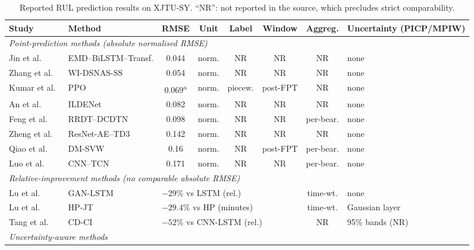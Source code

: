 \begin{table}[!htbp]
\centering
\caption{Reported RUL prediction results on XJTU-SY. ``NR'': not
reported in the source, which precludes strict comparability.}
\label{tab:benchmark}
\scriptsize
\renewcommand{\arraystretch}{1.15}
\setlength{\tabcolsep}{3pt}
\begin{tabular}{llcccccl}
\toprule
\textbf{Study} & \textbf{Method} & \textbf{RMSE} & \textbf{Unit} &
\textbf{Label} & \textbf{Window} & \textbf{Aggreg.} &
\textbf{Uncertainty (PICP/MPIW)} \\
\midrule
\multicolumn{8}{l}{\textit{Point-prediction methods (absolute normalised RMSE)}}\\
Jin et al.~\cite{app15179529}        & EMD--BiLSTM--Transf. & 0.044 & norm. & NR & NR & NR & none \\
Zhang et al.~\cite{11682466}         & WI-DSNAS-SS          & 0.054 & norm. & NR & NR & NR & none \\
Kumar et al.~\cite{machines14060672} & PPO                  & 0.069\textsuperscript{a} & norm. & piecew. & post-FPT & NR & none \\
An et al.~\cite{10935355}            & ILDENet              & 0.082 & norm. & NR & NR & NR & none \\
Feng et al.~\cite{FENG2026105865}    & RRDT--DCDTN          & 0.098 & norm. & NR & NR & per-bear. & none \\
Zheng et al.~\cite{10423873}         & ResNet-AE--TD3       & 0.142 & norm. & NR & NR & NR & none \\
Qiao et al.~\cite{QIAO2026112248}    & DM-SVW               & 0.16  & norm. & NR & post-FPT & per-bear. & none \\
Luo et al.~\cite{11637655}           & CNN--TCN             & 0.171 & norm. & NR & NR & per-bear. & none \\
\midrule
\multicolumn{8}{l}{\textit{Relative-improvement methods (no comparable absolute RMSE)}}\\
Lu et al.~\cite{9486650}             & GAN-LSTM             & \multicolumn{4}{l}{$-29\%$ vs LSTM (rel.)}       & time-wt. & none \\
Lu et al.~\cite{lu_joint_2022}       & HP-JT                & \multicolumn{4}{l}{$-29.4\%$ vs HP (minutes)}    & time-wt. & Gaussian layer \\
Tang et al.~\cite{10555355}          & CD-CI                & \multicolumn{4}{l}{$-52\%$ vs CNN-LSTM (rel.)}   & NR & 95\% bands (NR) \\
\midrule
\multicolumn{8}{l}{\textit{Uncertainty-aware methods}}\\

\end{tabular}
\end{table}
